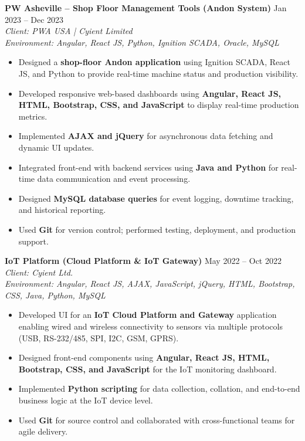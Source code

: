 \documentclass[9.5pt, letterpaper]{article}
\begin{document}
\vspace{2pt}

\textbf{PW Asheville -- Shop Floor Management Tools (Andon System)} \hfill Jan 2023 -- Dec 2023 \\
\textit{Client: PWA USA | Cyient Limited} \\
\textit{Environment: Angular, React JS, Python, Ignition SCADA, Oracle, MySQL}

\begin{itemize}
    \item Designed a \textbf{shop-floor Andon application} using Ignition SCADA, React JS, and Python to provide real-time machine status and production visibility.
    \item Developed responsive web-based dashboards using \textbf{Angular, React JS, HTML, Bootstrap, CSS, and JavaScript} to display real-time production metrics.
    \item Implemented \textbf{AJAX and jQuery} for asynchronous data fetching and dynamic UI updates.
    \item Integrated front-end with backend services using \textbf{Java and Python} for real-time data communication and event processing.
    \item Designed \textbf{MySQL database queries} for event logging, downtime tracking, and historical reporting.
    \item Used \textbf{Git} for version control; performed testing, deployment, and production support.
\end{itemize}

\newpage

\textbf{IoT Platform (Cloud Platform \& IoT Gateway)} \hfill May 2022 -- Oct 2022 \\
\textit{Client: Cyient Ltd.} \\
\textit{Environment: Angular, React JS, AJAX, JavaScript, jQuery, HTML, Bootstrap, CSS, Java, Python, MySQL}

\begin{itemize}
    \item Developed UI for an \textbf{IoT Cloud Platform and Gateway} application enabling wired and wireless connectivity to sensors via multiple protocols (USB, RS-232/485, SPI, I2C, GSM, GPRS).
    \item Designed front-end components using \textbf{Angular, React JS, HTML, Bootstrap, CSS, and JavaScript} for the IoT monitoring dashboard.
    \item Implemented \textbf{Python scripting} for data collection, collation, and end-to-end business logic at the IoT device level.
    \item Used \textbf{Git} for source control and collaborated with cross-functional teams for agile delivery.
\end{itemize}
\end{document}
